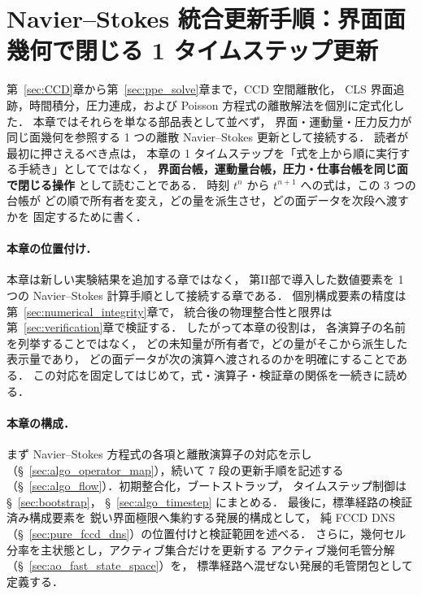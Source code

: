 
\section{Navier--Stokes 統合更新手順：界面面幾何で閉じる 1 タイムステップ更新}
\label{sec:algorithm}

第~\ref{sec:CCD}章から第~\ref{sec:ppe_solve}章まで，CCD 空間離散化，
CLS 界面追跡，時間積分，圧力連成，および Poisson 方程式の離散解法を個別に定式化した．
本章ではそれらを単なる部品表として並べず，
界面・運動量・圧力反力が同じ面幾何を参照する
1 つの離散 Navier--Stokes 更新として接続する．
読者が最初に押さえるべき点は，
本章の 1 タイムステップを「式を上から順に実行する手続き」としてではなく，
\textbf{界面台帳，運動量台帳，圧力・仕事台帳を同じ面で閉じる操作}
として読むことである．
時刻 $t^n$ から $t^{n+1}$ への式は，この 3 つの台帳が
どの順で所有者を変え，どの量を派生させ，どの面データを次段へ渡すかを
固定するために書く．

\paragraph{本章の位置付け．}
本章は新しい実験結果を追加する章ではなく，
第II部で導入した数値要素を 1 つの Navier--Stokes 計算手順として接続する章である．
個別構成要素の精度は第~\ref{sec:numerical_integrity}章で，
統合後の物理整合性と限界は第~\ref{sec:verification}章で検証する．
したがって本章の役割は，
各演算子の名前を列挙することではなく，
どの未知量が所有者で，どの量がそこから派生した表示量であり，
どの面データが次の演算へ渡されるのかを明確にすることである．
この対応を固定してはじめて，式・演算子・検証章の関係を一続きに読める．

\paragraph{本章の構成．}
まず Navier--Stokes 方程式の各項と離散演算子の対応を示し
（§~\ref{sec:algo_operator_map}），続いて 7 段の更新手順を記述する
（§~\ref{sec:algo_flow}）．初期整合化，ブートストラップ，
タイムステップ制御は §~\ref{sec:bootstrap}，
§~\ref{sec:algo_timestep} にまとめる．
最後に，標準経路の検証済み構成要素を
鋭い界面極限へ集約する発展的構成として，
純 FCCD DNS（§~\ref{sec:pure_fccd_dns}）の位置付けと検証範囲を述べる．
さらに，幾何セル分率を主状態とし，アクティブ集合だけを更新する
アクティブ幾何毛管分解（§~\ref{sec:ao_fast_state_space}）を，
標準経路へ混ぜない発展的毛管閉包として定義する．


